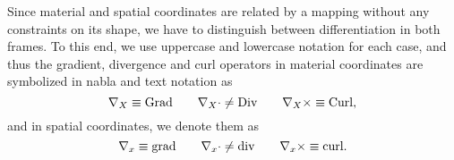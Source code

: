 Since material and spatial coordinates are related by a mapping without any constraints on its shape, we have to distinguish between differentiation in both frames. To this end, we use uppercase and lowercase notation for each case, and thus the gradient, divergence and curl operators in material coordinates are symbolized in nabla and text notation as 
\begin{equation*}
    \nabla_X \equiv \text{Grad} \qquad \nabla_X\cdot \neq \text{Div} \qquad \nabla_X \times \equiv \text{Curl},
\end{equation*}
and in spatial coordinates, we denote them as 
\begin{equation*}
    \nabla_x \equiv \text{grad} \qquad \nabla_x\cdot \neq \text{div} \qquad \nabla_x \times \equiv \text{curl}.
\end{equation*}


